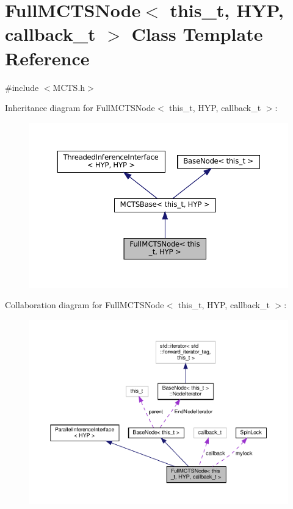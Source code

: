 \hypertarget{class_full_m_c_t_s_node}{}\section{Full\+M\+C\+T\+S\+Node$<$ this\+\_\+t, H\+YP, callback\+\_\+t $>$ Class Template Reference}
\label{class_full_m_c_t_s_node}


{\ttfamily \#include $<$M\+C\+T\+S.\+h$>$}



Inheritance diagram for Full\+M\+C\+T\+S\+Node$<$ this\+\_\+t, H\+YP, callback\+\_\+t $>$\+:
\nopagebreak
\begin{figure}[H]
\begin{center}
\leavevmode
\includegraphics[width=330pt]{class_full_m_c_t_s_node__inherit__graph}
\end{center}
\end{figure}


Collaboration diagram for Full\+M\+C\+T\+S\+Node$<$ this\+\_\+t, H\+YP, callback\+\_\+t $>$\+:
\nopagebreak
\begin{figure}[H]
\begin{center}
\leavevmode
\includegraphics[width=350pt]{class_full_m_c_t_s_node__coll__graph}
\end{center}
\end{figure}
